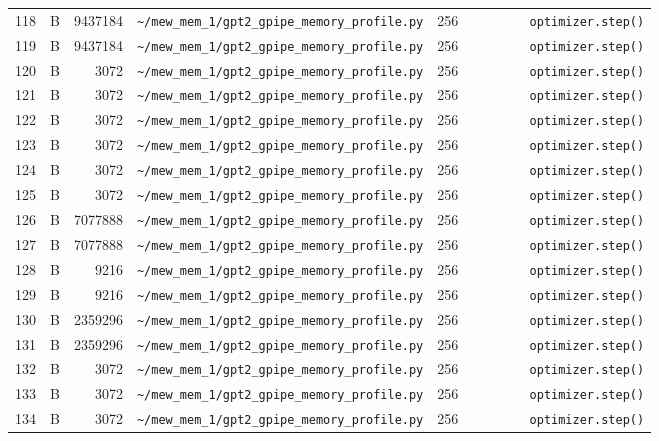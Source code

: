 \documentclass{article}
\begin{document}
\begin{longtable}{r l r p{6.5cm} r p{7.0cm}}
118 & B & 9437184 & \lstinline|~/mew_mem_1/gpt2_gpipe_memory_profile.py| & 256 & \lstinline|        optimizer.step()| \\
119 & B & 9437184 & \lstinline|~/mew_mem_1/gpt2_gpipe_memory_profile.py| & 256 & \lstinline|        optimizer.step()| \\
120 & B & 3072 & \lstinline|~/mew_mem_1/gpt2_gpipe_memory_profile.py| & 256 & \lstinline|        optimizer.step()| \\
121 & B & 3072 & \lstinline|~/mew_mem_1/gpt2_gpipe_memory_profile.py| & 256 & \lstinline|        optimizer.step()| \\
122 & B & 3072 & \lstinline|~/mew_mem_1/gpt2_gpipe_memory_profile.py| & 256 & \lstinline|        optimizer.step()| \\
123 & B & 3072 & \lstinline|~/mew_mem_1/gpt2_gpipe_memory_profile.py| & 256 & \lstinline|        optimizer.step()| \\
124 & B & 3072 & \lstinline|~/mew_mem_1/gpt2_gpipe_memory_profile.py| & 256 & \lstinline|        optimizer.step()| \\
125 & B & 3072 & \lstinline|~/mew_mem_1/gpt2_gpipe_memory_profile.py| & 256 & \lstinline|        optimizer.step()| \\
126 & B & 7077888 & \lstinline|~/mew_mem_1/gpt2_gpipe_memory_profile.py| & 256 & \lstinline|        optimizer.step()| \\
127 & B & 7077888 & \lstinline|~/mew_mem_1/gpt2_gpipe_memory_profile.py| & 256 & \lstinline|        optimizer.step()| \\
128 & B & 9216 & \lstinline|~/mew_mem_1/gpt2_gpipe_memory_profile.py| & 256 & \lstinline|        optimizer.step()| \\
129 & B & 9216 & \lstinline|~/mew_mem_1/gpt2_gpipe_memory_profile.py| & 256 & \lstinline|        optimizer.step()| \\
130 & B & 2359296 & \lstinline|~/mew_mem_1/gpt2_gpipe_memory_profile.py| & 256 & \lstinline|        optimizer.step()| \\
131 & B & 2359296 & \lstinline|~/mew_mem_1/gpt2_gpipe_memory_profile.py| & 256 & \lstinline|        optimizer.step()| \\
132 & B & 3072 & \lstinline|~/mew_mem_1/gpt2_gpipe_memory_profile.py| & 256 & \lstinline|        optimizer.step()| \\
133 & B & 3072 & \lstinline|~/mew_mem_1/gpt2_gpipe_memory_profile.py| & 256 & \lstinline|        optimizer.step()| \\
134 & B & 3072 & \lstinline|~/mew_mem_1/gpt2_gpipe_memory_profile.py| & 256 & \lstinline|        optimizer.step()| \\

\end{longtable}
\end{document}
